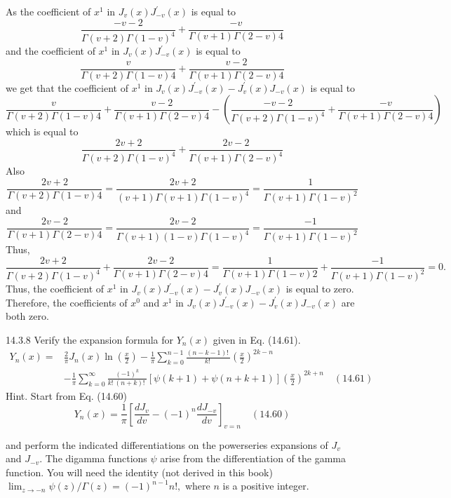 \documentclass{article}
\begin{document}
\begin{flushleft}
As the coefficient of $x^{1}$ in $J_{v}(x) J_{-v}^{\prime}(x)$ is equal to 
$$\frac{-v-2}{\Gamma(v+2) \Gamma(1-v)^{4}}+\frac{-v}{\Gamma(v+1) \Gamma(2-v) 4}$$
and the coefficient of $x^{1}$ in $J_{v}(x) J_{-v}^{\prime}(x)$ is equal to 
$$\frac{v}{\Gamma(v+2) \Gamma(1-v) 4}+\frac{v-2}{\Gamma(v+1) \Gamma(2-v) 4}$$
we get that the coefficient of $x^{1}$ in $J_{v}(x) J_{-v}^{\prime}(x)-J_{v}^{\prime}(x) J_{-v}(x)$ is equal to 
$$\frac{v}{\Gamma(v+2) \Gamma(1-v) 4}+\frac{v-2}{\Gamma(v+1) \Gamma(2-v) 4}-\left(\frac{-v-2}{\Gamma(v+2) \Gamma(1-v)^{4}}+\frac{-v}{\Gamma(v+1) \Gamma(2-v) 4}\right)$$ 
which is equal to 
$$\frac{2 v+2}{\Gamma(v+2) \Gamma(1-v)^{4}}+\frac{2 v-2}{\Gamma(v+1) \Gamma(2-v)^{4}}$$
Also 
$$\frac{2 v+2}{\Gamma(v+2) \Gamma(1-v) 4}=\frac{2 v+2}{(v+1) \Gamma(v+1) \Gamma(1-v)^{4}}=\frac{1}{\Gamma(v+1) \Gamma(1-v)^{2}}$$ 
and
$$\frac{2 v-2}{\Gamma(v+1) \Gamma(2-v) 4}=\frac{2 v-2}{\Gamma(v+1)(1-v) \Gamma(1-v)^{4}}=\frac{-1}{\Gamma(v+1) \Gamma(1-v)^{2}}$$
Thus, 
$$\frac{2 v+2}{\Gamma(v+2) \Gamma(1-v)^{4}}+\frac{2 v-2}{\Gamma(v+1) \Gamma(2-v) 4}=\frac{1}{\Gamma(v+1) \Gamma(1-v) 2}+\frac{-1}{\Gamma(v+1) \Gamma(1-v)^{2}}=0 .$$
Thus, the coefficient of $x^{1}$ in $J_{v}(x) J_{-v}^{\prime}(x)-J_{v}^{\prime}(x) J_{-v}(x)$ is equal to zero. Therefore, the coefficients of $x^{0}$ and $x^{1}$ in $J_{v}(x) J_{-v}^{\prime}(x)-J_{v}^{\prime}(x) J_{-v}(x)$ are both zero.

\newpage


\begin{mybox}{14.3.8}
Verify the expansion formula for $Y_{n}(x)$ given in Eq. (14.61).
$$
\begin{aligned}
Y_{n}(x)=& \frac{2}{\pi} J_{n}(x) \ln \left(\frac{x}{2}\right)-\frac{1}{\pi} \sum_{k=0}^{n-1} \frac{(n-k-1) ! \ }{k ! \ }\left(\frac{x}{2}\right)^{2 k-n} \\
&-\frac{1}{\pi} \sum_{k=0}^{\infty} \frac{(-1)^{k}}{k ! \ (n+k) ! \ }[\psi(k+1)+\psi(n+k+1)]\left(\frac{x}{2}\right)^{2 k+n} \quad (14.61)
\end{aligned}
$$
Hint. Start from Eq. (14.60) 
$$
Y_{n}(x)=\frac{1}{\pi}\left[\frac{d J_{v}}{d v}-(-1)^{n} \frac{d J_{-v}}{d v}\right]_{v=n} \quad (14.60)
$$

and perform the indicated differentiations on the powerseries expansions of $J_{v}$ and $J_{-v}$. The digamma functions $\psi$ arise from the differentiation of the gamma function. You will need the identity (not derived in this book) $\lim _{z \rightarrow-n} \psi(z) / \Gamma(z)=(-1)^{n-1} n !,$ where $n$ is a positive integer.


\end{mybox}
\end{flushleft}
\end{document}
